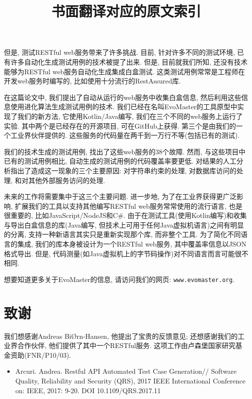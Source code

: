    但是, 测试RESTful web服务带来了许多挑战. 目前, 针对许多不同的测试环境, 已有许多自动化生成测试用例的技术被提了出来. 但是, 目前就我们所知, 还没有技术能够为RESTful web服务自动化生成集成白盒测试. 这类测试用例常常是工程师在开发web服务时编写的, 比如使用十分流行的RestAssured库. 
    
    在这篇论文中, 我们提出了自动从运行的web服务中收集白盒信息, 然后利用这些信息使用进化算法生成测试用例的技术. 我们已经在名叫EvoMaster的工具原型中实现了我们的新方法, 它使用Kotlin/Java编写, 我们在三个不同的web服务上运行了实验. 其中两个是已经存在的开源项目, 可在GitHub上获得. 第三个是由我们的一个工业界伙伴提供的. 这些服务的代码量在两千到一万行不等(包括已有的测试). 
    
    我们的技术生成的测试用例, 找出了这些web服务的38个故障. 然而, 与这些项目中已有的测试用例相比, 自动生成的测试用例的代码覆盖率要更低. 对结果的人工分析指出了造成这一现象的三个主要原因: 对字符串约束的处理, 对数据库访问的处理, 和对其他外部服务访问的处理. 
    
    未来的工作将需要集中于这三个主要问题. 进一步地, 为了在工业界获得更广泛影响, 扩展我们的工具以支持其他编写RESTful web服务常常使用的流行语言, 也是很重要的, 比如JavaScript/NodeJS和C\#. 由于在测试工具(使用Kotlin编写)和收集与导出白盒信息的库(Java编写, 但技术上可用于任何Java虚拟机语言)之间有明显的分离, 支持一种新语言其实只是重新实现那个库, 而非整个工具. 为了简化不同语言的集成, 我们的库本身被设计为一个RESTful web服务, 其中覆盖率信息以JSON格式导出. 但是, 代码测量(如Java虚拟机上的字节码操作)对不同语言而言可能很不相同.
    
    想要知道更多关于EvoMaster的信息, 请访问我们的网页: \texttt{www.evomaster.org}. 

\section*{致谢}
  我们想感谢Andreas BiØrn-Hansen, 他提出了宝贵的反馈意见; 还想感谢我们的工业界合作伙伴, 他们提供了其中一个RESTful服务. 这项工作由卢森堡国家研究基金资助(FNR/P10/03). 

\title{书面翻译对应的原文索引}

  \begin{itemize}
    \item Arcuri. Andrea. 
    Restful API Automated Test Case Generation\allowbreak[C]// 
    \allowbreak{}Software Quality, Reliability and Security (QRS),
    2017 IEEE International Conference on:
    IEEE, 2017: 9-20. 
    DOI 10.1109/QRS.2017.11
  \end{itemize}

% 

